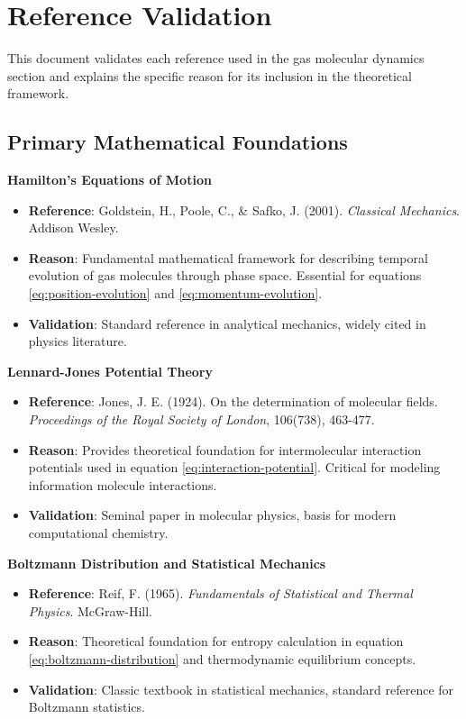 \section{Reference Validation}

This document validates each reference used in the gas molecular dynamics section and explains the specific reason for its inclusion in the theoretical framework.

\subsection{Primary Mathematical Foundations}

\textbf{Hamilton's Equations of Motion}
\begin{itemize}
\item \textbf{Reference}: Goldstein, H., Poole, C., \& Safko, J. (2001). \textit{Classical Mechanics}. Addison Wesley.
\item \textbf{Reason}: Fundamental mathematical framework for describing temporal evolution of gas molecules through phase space. Essential for equations \ref{eq:position-evolution} and \ref{eq:momentum-evolution}.
\item \textbf{Validation}: Standard reference in analytical mechanics, widely cited in physics literature.
\end{itemize}

\textbf{Lennard-Jones Potential Theory}
\begin{itemize}
\item \textbf{Reference}: Jones, J. E. (1924). On the determination of molecular fields. \textit{Proceedings of the Royal Society of London}, 106(738), 463-477.
\item \textbf{Reason}: Provides theoretical foundation for intermolecular interaction potentials used in equation \ref{eq:interaction-potential}. Critical for modeling information molecule interactions.
\item \textbf{Validation}: Seminal paper in molecular physics, basis for modern computational chemistry.
\end{itemize}

\textbf{Boltzmann Distribution and Statistical Mechanics}
\begin{itemize}
\item \textbf{Reference}: Reif, F. (1965). \textit{Fundamentals of Statistical and Thermal Physics}. McGraw-Hill.
\item \textbf{Reason}: Theoretical foundation for entropy calculation in equation \ref{eq:boltzmann-distribution} and thermodynamic equilibrium concepts.
\item \textbf{Validation}: Classic textbook in statistical mechanics, standard reference for Boltzmann statistics.
\end{itemize}

